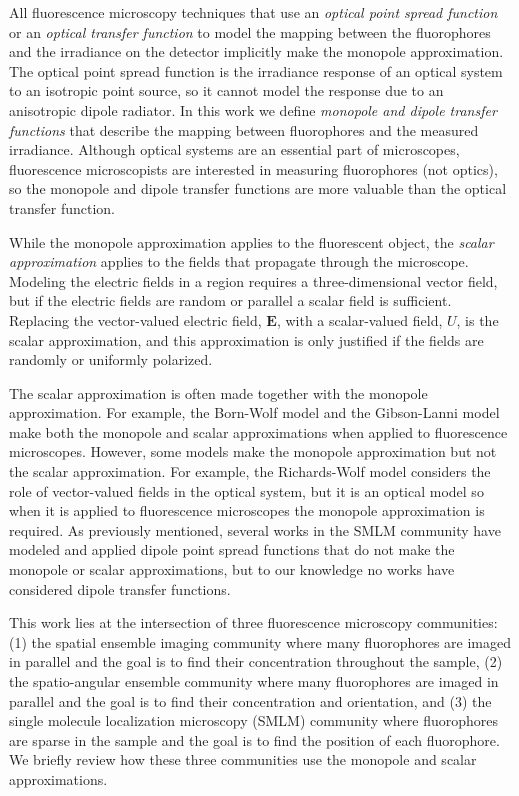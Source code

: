 \documentclass[]{osa-article}
\providecommand{\mb}[1]{\mathbf{#1}}
\begin{document}
All fluorescence microscopy techniques that use an \textit{optical point spread
  function} or an \textit{optical transfer function} to model the mapping
between the fluorophores and the irradiance on the detector implicitly make the
monopole approximation. The optical point spread function is the irradiance
response of an optical system to an isotropic point source, so it cannot model
the response due to an anisotropic dipole radiator. In this work we define
\textit{monopole and dipole transfer functions} that describe the mapping
between fluorophores and the measured irradiance. Although optical systems are
an essential part of microscopes, fluorescence microscopists are interested in
measuring fluorophores (not optics), so the monopole and dipole transfer
functions are more valuable than the optical transfer function.

While the monopole approximation applies to the fluorescent object, the
\textit{scalar approximation} applies to the fields that propagate through the
microscope. Modeling the electric fields in a region requires a
three-dimensional vector field, but if the electric fields are random or
parallel a scalar field is sufficient. Replacing the vector-valued electric
field, $\mb{E}$, with a scalar-valued field, $U$, is the scalar approximation,
and this approximation is only justified if the fields are randomly or uniformly
polarized.

The scalar approximation is often made together with the monopole approximation.
For example, the Born-Wolf model \cite{born1980} and the Gibson-Lanni model
\cite{gibson89} make both the monopole and scalar approximations when applied to
fluorescence microscopes. However, some models make the monopole approximation
but not the scalar approximation. For example, the Richards-Wolf model
\cite{richards} considers the role of vector-valued fields in the optical
system, but it is an optical model so when it is applied to fluorescence
microscopes the monopole approximation is required. As previously mentioned,
several works in the SMLM community have modeled and applied dipole point spread
functions that do not make the monopole or scalar approximations, but to our
knowledge no works have considered dipole transfer functions.

This work lies at the intersection of three fluorescence microscopy communities:
(1) the spatial ensemble imaging community where many fluorophores are imaged in
parallel and the goal is to find their concentration throughout the sample, (2)
the spatio-angular ensemble community where many fluorophores are imaged in
parallel and the goal is to find their concentration and orientation, and (3)
the single molecule localization microscopy (SMLM) community where fluorophores
are sparse in the sample and the goal is to find the position of each
fluorophore. We briefly review how these three communities use the monopole and
scalar approximations.
\end{document}
